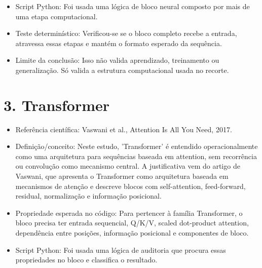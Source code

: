 \begin{itemize}
\item Script Python:
Foi usada uma lógica de bloco neural composto por mais de uma etapa
computacional.
\end{itemize}

\begin{itemize}
\item Teste determinístico:
Verificou-se se o bloco completo recebe a entrada, atravessa essas etapas e
mantém o formato esperado da sequência.
\end{itemize}

\begin{itemize}
\item Limite da conclusão:
Isso não valida aprendizado, treinamento ou generalização. Só valida a
estrutura computacional usada no recorte.
\end{itemize}



\section{3. Transformer}


\begin{itemize}
\item Referência científica:
Vaswani et al., Attention Is All You Need, 2017.
\end{itemize}

\begin{itemize}
\item Definição/conceito:
Neste estudo, 'Transformer' é entendido operacionalmente como uma arquitetura
para sequências baseada em attention, sem recorrência ou convolução como
mecanismo central. A justificativa vem do artigo de Vaswani, que apresenta o
Transformer como arquitetura baseada em mecanismos de atenção e descreve blocos
com self-attention, feed-forward, residual, normalização e informação
posicional.
\end{itemize}

\begin{itemize}
\item Propriedade esperada no código:
Para pertencer à família Transformer, o bloco precisa ter entrada sequencial,
Q/K/V, scaled dot-product attention, dependência entre posições, informação
posicional e componentes de bloco.
\end{itemize}

\begin{itemize}
\item Script Python:
Foi usada uma lógica de auditoria que procura essas propriedades no bloco e
classifica o resultado.
\end{itemize}


